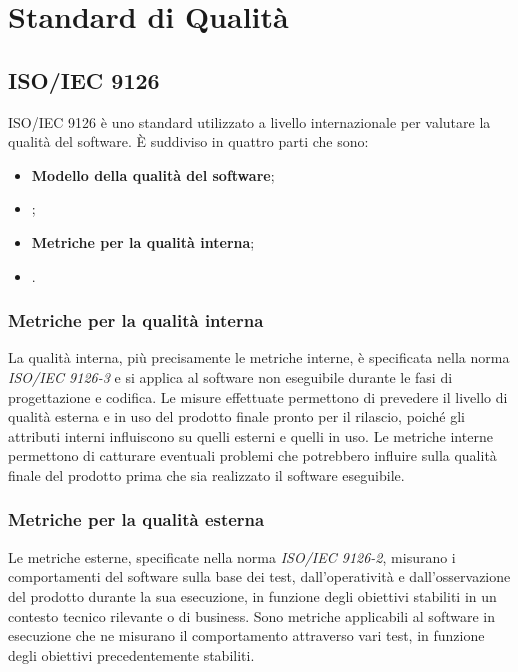 \appendix
\section{Standard di Qualità}

\subsection{ISO/IEC 9126}
ISO/IEC 9126 è uno standard utilizzato a livello internazionale per valutare la qualità del software.
È suddiviso in quattro parti che sono:
\begin{itemize}
\item \textbf{Modello della qualità del software};
\item \textbf{};
\item \textbf{Metriche per la qualità interna};
\item \textbf{}.
\end{itemize}

\subsubsection{Metriche per la qualità interna}
La qualità interna, più precisamente le metriche interne, è specificata nella norma \textit{ISO/IEC 9126-3} e si applica al software non eseguibile durante le fasi di progettazione e codifica. 
Le misure effettuate permettono di prevedere il livello di qualità esterna e in uso del prodotto finale pronto per il rilascio, poiché gli attributi interni influiscono su quelli esterni e quelli in uso. 
Le metriche interne permettono di catturare eventuali problemi che potrebbero influire sulla qualità finale del prodotto prima che sia realizzato il software eseguibile. 

\subsubsection{Metriche per la qualità esterna}
Le metriche esterne, specificate nella norma \textit{ISO/IEC 9126-2}, misurano i comportamenti del software sulla base dei test, dall'operatività e dall'osservazione del prodotto durante la sua esecuzione, in funzione degli obiettivi stabiliti in un contesto tecnico rilevante o di business. Sono metriche applicabili al software in esecuzione che ne misurano il comportamento attraverso vari test, in funzione degli obiettivi precedentemente stabiliti.

